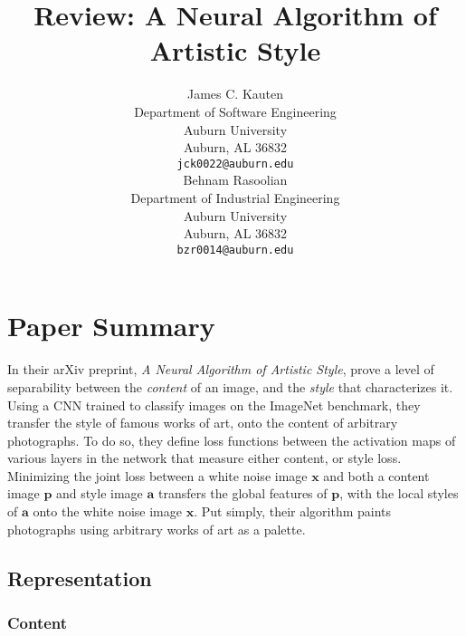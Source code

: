 \documentclass{article}
\begin{document}
\title{Review: A Neural Algorithm of Artistic Style}

\author{
    James C. Kauten \\
    Department of Software Engineering \\
    Auburn University \\
    Auburn, AL 36832 \\
    \texttt{jck0022@auburn.edu} \\
    \And
    Behnam Rasoolian \\
    Department of Industrial Engineering \\
    Auburn University \\
    Auburn, AL 36832 \\
    \texttt{bzr0014@auburn.edu} \\
}

\maketitle

\hypertarget{paper-summary}{%
\section{Paper Summary}\label{paper-summary}}

In their arXiv preprint, \textit{A Neural Algorithm of Artistic Style},
\cite{gatys2016image} prove a level of separability between the
\textit{content} of an image, and the \textit{style} that characterizes it.
Using a \ac{CNN} trained to classify images on the ImageNet benchmark, they
transfer the style of famous works of art, onto the content of arbitrary
photographs. To do so, they define loss functions between the activation maps
of various layers in the network that measure either content, or style loss.
Minimizing the joint loss between a white noise image $\textbf{x}$ and both a
content image $\textbf{p}$ and style image $\textbf{a}$ transfers the global
features of $\textbf{p}$, with the local styles of $\textbf{a}$ onto the white
noise image $\textbf{x}$. Put simply, their algorithm paints photographs using
arbitrary works of art as a palette.

\subsection{Representation}

\subsubsection{Content}
\end{document}
